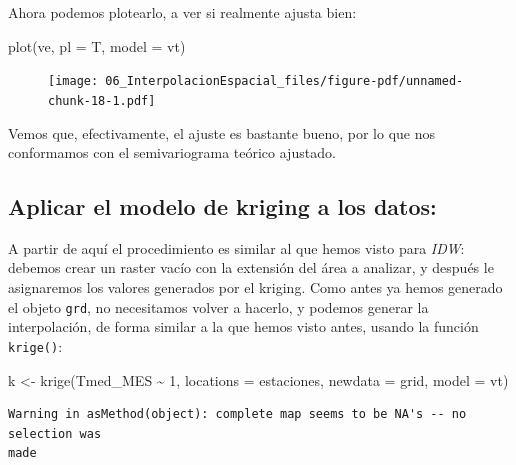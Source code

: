 \documentclass[
  letterpaper,
  DIV=11,
  numbers=noendperiod]{scrreprt}
\newenvironment{Shaded}{\begin{snugshade}}{\end{snugshade}}
\newcommand{\AttributeTok}[1]{\textcolor[rgb]{0.40,0.45,0.13}{#1}}
\newcommand{\DecValTok}[1]{\textcolor[rgb]{0.68,0.00,0.00}{#1}}
\newcommand{\FunctionTok}[1]{\textcolor[rgb]{0.28,0.35,0.67}{#1}}
\newcommand{\NormalTok}[1]{\textcolor[rgb]{0.00,0.23,0.31}{#1}}
\newcommand{\OtherTok}[1]{\textcolor[rgb]{0.00,0.23,0.31}{#1}}
\newcommand{\SpecialCharTok}[1]{\textcolor[rgb]{0.37,0.37,0.37}{#1}}
\begin{document}
Ahora podemos plotearlo, a ver si realmente ajusta bien:

\begin{Shaded}
\begin{Highlighting}[]
\FunctionTok{plot}\NormalTok{(ve, }\AttributeTok{pl =}\NormalTok{ T, }\AttributeTok{model =}\NormalTok{ vt)}
\end{Highlighting}
\end{Shaded}

\begin{figure}[H]

{\centering \texttt{[image: 06\_InterpolacionEspacial\_files/figure-pdf/unnamed-chunk-18-1.pdf]}

}

\end{figure}

Vemos que, efectivamente, el ajuste es bastante bueno, por lo que nos
conformamos con el semivariograma teórico ajustado.

\hypertarget{aplicar-el-modelo-de-kriging-a-los-datos}{%
\subsection{Aplicar el modelo de kriging a los
datos:}\label{aplicar-el-modelo-de-kriging-a-los-datos}}

A partir de aquí el procedimiento es similar al que hemos visto para
\emph{IDW}: debemos crear un raster vacío con la extensión del área a
analizar, y después le asignaremos los valores generados por el kriging.
Como antes ya hemos generado el objeto \texttt{grd}, no necesitamos
volver a hacerlo, y podemos generar la interpolación, de forma similar a
la que hemos visto antes, usando la función \texttt{krige()}:

\begin{Shaded}
\begin{Highlighting}[]
\NormalTok{k }\OtherTok{\textless{}{-}} \FunctionTok{krige}\NormalTok{(Tmed\_MES }\SpecialCharTok{\textasciitilde{}} \DecValTok{1}\NormalTok{, }\AttributeTok{locations =}\NormalTok{ estaciones, }\AttributeTok{newdata =}\NormalTok{ grid, }\AttributeTok{model =}\NormalTok{ vt)}
\end{Highlighting}
\end{Shaded}

\begin{verbatim}
Warning in asMethod(object): complete map seems to be NA's -- no selection was
made
\end{verbatim}
\end{document}
